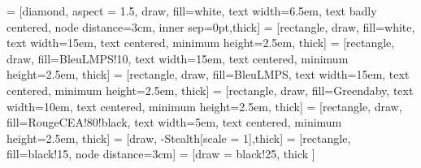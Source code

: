  = [diamond, aspect = 1.5, draw, fill=white, text width=6.5em, text badly centered, node distance=3cm, inner sep=0pt,thick]
 = [rectangle, draw, fill=white, text width=15em, text centered, minimum height=2.5em, thick]
 = [rectangle, draw, fill=BleuLMPS!10, text width=15em, text centered, minimum height=2.5em, thick]
 = [rectangle, draw, fill=BleuLMPS, text width=15em, text centered, minimum height=2.5em, thick]
 = [rectangle, draw, fill=Greendaby, text width=10em, text centered, minimum height=2.5em, thick]
 = [rectangle, draw, fill=RougeCEA!80!black, text width=5em, text centered, minimum height=2.5em, thick]
 = [draw, -{Stealth[scale = 1]},thick]
 = [rectangle, fill=black!15, node distance=3cm]
 = [draw = black!25, thick ]

